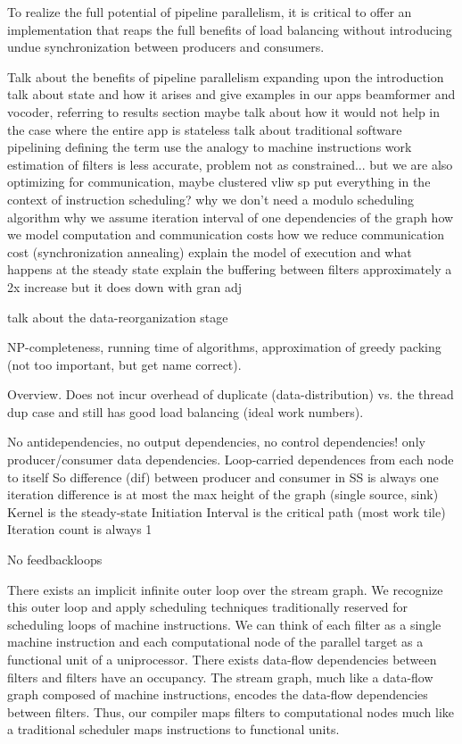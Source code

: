 To realize the full potential of pipeline parallelism, it is critical
to offer an implementation that reaps the full benefits of load
balancing without introducing undue synchronization between producers
and consumers.

Talk about the benefits of pipeline parallelism
  expanding upon the introduction
  talk about state and how it arises and give examples in our apps
     beamformer and vocoder, referring to results section
  maybe talk about how it would not help in the case where the entire
     app is stateless
  talk about traditional software pipelining defining the term
  use the analogy to machine instructions
     work estimation of filters is less accurate, problem not as 
             constrained...
     but we are also optimizing for communication, maybe clustered
             vliw sp
  put everything in the context of instruction scheduling?
  why we don't need a modulo scheduling algorithm
  why we assume iteration interval of one
  dependencies of the graph
  how we model computation and communication costs
  how we reduce communication cost (synchronization annealing)
  explain the model of execution and what happens at the steady state
  explain the buffering between filters
	approximately a 2x increase but it does down with gran adj
  
talk about the data-reorganization stage

NP-completeness, running time of algorithms, approximation of greedy
packing (not too important, but get name correct).

Overview.
Does not incur overhead of duplicate (data-distribution) vs. the
thread dup case and still has good load balancing (ideal work numbers).


No antidependencies, no output dependencies, no control dependencies!
only producer/consumer data dependencies.
Loop-carried dependences from each node to itself
So difference (dif) between producer and consumer in SS is always one
iteration difference is at most the max height of the graph 
(single source, sink)
Kernel is the steady-state
Initiation Interval is the critical path (most work tile)
Iteration count is always 1

No feedbackloops


There exists an implicit infinite outer loop over the stream graph. We
recognize this outer loop and apply scheduling techniques
traditionally reserved for scheduling loops of machine
instructions. We can think of each filter as a single machine
instruction and each computational node of the parallel target as a
functional unit of a uniprocessor. There exists data-flow dependencies
between filters and filters have an occupancy.  The stream graph, much
like a data-flow graph composed of machine instructions, encodes the
data-flow dependencies between filters. Thus, our compiler maps
filters to computational nodes much like a traditional scheduler maps
instructions to functional units.

